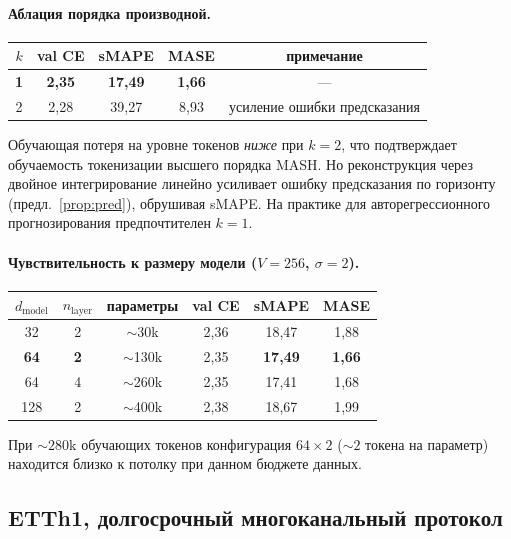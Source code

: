 \documentclass[11pt]{article}
\theoremstyle{remark}
\begin{document}
\paragraph{Аблация порядка производной.}
\begin{center}
\begin{tabular}{ccccc}
\toprule
$k$ & val CE & sMAPE & MASE & примечание \\
\midrule
\textbf{1} & \textbf{2{,}35} & \textbf{17{,}49} & \textbf{1{,}66} & --- \\
2 & 2{,}28 & 39{,}27 & 8{,}93 & усиление ошибки предсказания \\
\bottomrule
\end{tabular}
\end{center}

Обучающая потеря на уровне токенов \emph{ниже} при $k=2$, что
подтверждает обучаемость токенизации высшего порядка MASH. Но
реконструкция через двойное интегрирование линейно усиливает ошибку
предсказания по горизонту (предл.~\ref{prop:pred}), обрушивая sMAPE.
На практике для авторегрессионного прогнозирования предпочтителен
$k = 1$.

\paragraph{Чувствительность к размеру модели ($V = 256$, $\sigma = 2$).}
\begin{center}
\begin{tabular}{cccccc}
\toprule
$d_{\text{model}}$ & $n_{\text{layer}}$ & параметры & val CE & sMAPE & MASE \\
\midrule
32 & 2 & $\sim$30k  & 2{,}36 & 18{,}47 & 1{,}88 \\
\textbf{64} & \textbf{2} & $\sim$130k & 2{,}35 & \textbf{17{,}49} & \textbf{1{,}66} \\
64 & 4 & $\sim$260k & 2{,}35 & 17{,}41 & 1{,}68 \\
128 & 2 & $\sim$400k & 2{,}38 & 18{,}67 & 1{,}99 \\
\bottomrule
\end{tabular}
\end{center}

При $\sim 280$k обучающих токенов конфигурация $64 \times 2$ ($\sim 2$
токена на параметр) находится близко к потолку при данном бюджете
данных.

\subsection{ETTh1, долгосрочный многоканальный протокол}
\end{document}
